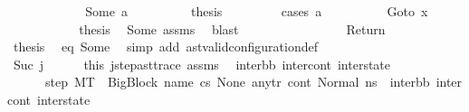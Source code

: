 \begin{isabellebody}
\ \ \ \ \isamarkupfalse%
\isanewline
\ \ \ \ \ \ \isamarkupfalse%
\ {\isacharparenleft}{\kern0pt}Some\ a{\isacharparenright}{\kern0pt}\isanewline
\ \ \ \ \ \ \isamarkupfalse%
\ \isamarkupfalse%
\ {\isacharquery}{\kern0pt}thesis\ \isanewline
\ \ \ \ \ \ \isamarkupfalse%
\ {\isacharparenleft}{\kern0pt}cases\ a{\isacharparenright}{\kern0pt}\isanewline
\ \ \ \ \ \ \ \ \isamarkupfalse%
\ {\isacharparenleft}{\kern0pt}Goto\ x{}{\isacharparenright}{\kern0pt}\isanewline
\ \ \ \ \ \ \ \ \isamarkupfalse%
\ \isamarkupfalse%
\ {\isacharquery}{\kern0pt}thesis\ \isamarkupfalse%
\ Some\ assms{\isacharparenleft}{\kern0pt}{}{\isacharparenright}{\kern0pt}\ \isamarkupfalse%
\ blast\isanewline
\ \ \ \ \ \ \isamarkupfalse%
\isanewline
\ \ \ \ \ \ \ \ \isamarkupfalse%
\ Return\isanewline
\ \ \ \ \ \ \ \ \isamarkupfalse%
\ \isamarkupfalse%
\ {\isacharquery}{\kern0pt}thesis\ \isamarkupfalse%
\ eq\ Some\ \isamarkupfalse%
\ {\isacharparenleft}{\kern0pt}simp\ add{\isacharcolon}{\kern0pt}\ ast{\isacharunderscore}{\kern0pt}valid{\isacharunderscore}{\kern0pt}configuration{\isacharunderscore}{\kern0pt}def{\isacharparenright}{\kern0pt}\ \isanewline
\ \ \ \ \ \ \isamarkupfalse%
\isanewline
\ \ \ \ \isamarkupfalse%
\isanewline
\ \ \isamarkupfalse%
\isanewline
\ \ \ \ \isamarkupfalse%
\ {\isacharparenleft}{\kern0pt}Suc\ j{\isacharprime}{\kern0pt}{\isacharparenright}{\kern0pt}\isanewline
\ \ \ \ \isamarkupfalse%
\ this\ j{\isacharunderscore}{\kern0pt}step{\isacharunderscore}{\kern0pt}ast{\isacharunderscore}{\kern0pt}trace\ assms{\isacharparenleft}{\kern0pt}{}{\isacharparenright}{\kern0pt}\ \isamarkupfalse%
\ inter{\isacharunderscore}{\kern0pt}bb\ inter{\isacharunderscore}{\kern0pt}cont\ inter{\isacharunderscore}{\kern0pt}state\ \isanewline
\ \ \ \ \ \ step{\isacharcolon}{\kern0pt}\ {\isachardoublequoteopen}M{\isacharcomma}{\kern0pt}{\isasymLambda}{\isacharcomma}{\kern0pt}{\isasymGamma}{\isacharcomma}{\kern0pt}{\isasymOmega}{\isacharcomma}{\kern0pt}T\ {\isasymturnstile}\ {\isasymlangle}{\isacharparenleft}{\kern0pt}{\isacharparenleft}{\kern0pt}BigBlock\ name\ cs{}\ None\ any{\isacharunderscore}{\kern0pt}tr{\isacharparenright}{\kern0pt}{\isacharcomma}{\kern0pt}\ cont{}{\isacharcomma}{\kern0pt}\ {\isacharparenleft}{\kern0pt}Normal\ ns{}{\isacharparenright}{\kern0pt}{\isacharparenright}{\kern0pt}{\isasymrangle}\ {\isasymlongrightarrow}\ {\isacharparenleft}{\kern0pt}inter{\isacharunderscore}{\kern0pt}bb{\isacharcomma}{\kern0pt}\ inter{\isacharunderscore}{\kern0pt}cont{\isacharcomma}{\kern0pt}\ inter{\isacharunderscore}{\kern0pt}state{\isacharparenright}{\kern0pt}{\isachardoublequoteclose}\ \isanewline

\end{isabellebody}
